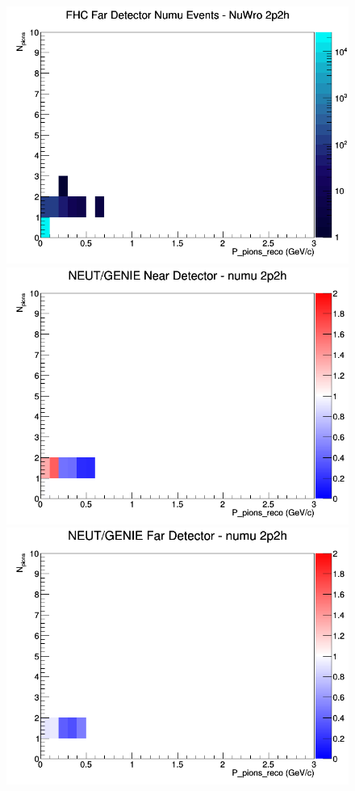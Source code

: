 \documentclass[12pt]{article}
\begin{document}
\begin{figure}[h]
\endminipage
{}
\includegraphics[width=\linewidth]{eff_N_P/LAr/pions/2p2h_FHC_FD_numu_N_P_NuWro.png}
\endminipage
\newline
{}
\includegraphics[width=\linewidth]{eff_N_P/LAr/pions/ratios/2p2h_NEUT_GENIE_numu_near_N_P.png}
\endminipage
{}
\includegraphics[width=\linewidth]{eff_N_P/LAr/pions/ratios/2p2h_NEUT_GENIE_numu_far_N_P.png}

\end{figure}
\end{document}
